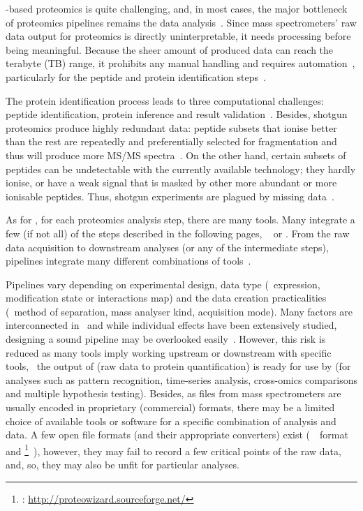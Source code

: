 \ms-based proteomics is quite challenging,
and, in most cases,
the major bottleneck of proteomics pipelines remains
the data analysis~.
Since mass spectrometers' raw data output
for proteomics is directly uninterpretable,
it needs processing before being meaningful.
Because the sheer amount of produced data can reach the terabyte (\gls{TB}) range,
it prohibits any manual handling and requires automation~,
particularly for the peptide and protein identification steps~.\mybr\

The protein identification process leads to three computational challenges:
peptide identification, protein inference and result validation~.
Besides, shotgun proteomics produce highly redundant data:
peptide subsets that ionise better than the rest
are repeatedly and preferentially selected for fragmentation
and thus will produce more \gls{MS/MS} spectra~.
On the other hand,
certain subsets of peptides can be undetectable with the currently available technology;
they hardly ionise, or have a weak signal that is masked
by other more abundant or more ionisable peptides.
Thus, shotgun experiments are plagued by missing data~.\mybr\

As for \Rnaseq, for each proteomics analysis step,
there are many tools.
Many integrate a few (if not all) of the steps described in the following pages,
\eg\ 
or .
From the raw data acquisition to downstream analyses
(or any of the intermediate steps),
pipelines integrate many different combinations of tools~.\mybr\

Pipelines vary depending on experimental design, data type
(\ie\ expression, modification state or interactions map)
and the data creation practicalities (\eg\ method of separation,
mass analyser kind, acquisition mode).
Many factors are interconnected in \ms\
and while individual effects have been extensively studied,
designing a sound pipeline may be overlooked easily~.
However,
this risk is reduced as
many tools imply working upstream or downstream with specific tools,
\eg\ the output of \soft{MaxQuant} (raw data to protein quantification) is
ready for use by 
(for analyses such as pattern recognition,
time-series analysis, cross-omics comparisons and multiple hypothesis testing).
Besides, as files from mass spectrometers are usually encoded
in proprietary (commercial) formats,
there may be a limited choice of available tools or software
for a specific combination of analysis and data.
A few open file formats (and their appropriate converters) exist
(\eg\ \mzml\ format~\mycite{mzML}
and \href{http://proteowizard.sourceforge.net/}{}\footnote{%
\soft{ProteoWizard}: \href{http://proteowizard.sourceforge.net/}%
{http://proteowizard.sourceforge.net/}}~\mycite{proteowizard2012}),
however, they may fail to record a few critical points of the raw data,
and, so, they may also be unfit for particular analyses.\mybr\

